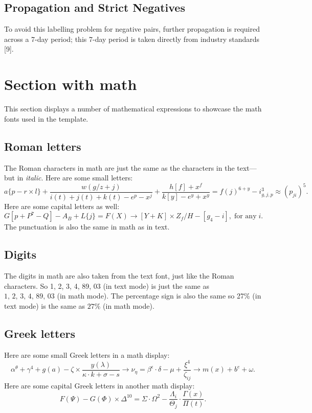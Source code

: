 \documentclass[letterpaper,11pt,leqno]{article}
\begin{document}
\subsection{Propagation and Strict Negatives}

To avoid this labelling problem for negative pairs, further propagation is required across a 7-day period; this 7-day period is taken directly from industry standards [9].

\section{Section with math}\label{s:math}

This section displays a number of mathematical expressions to showcase the math fonts used in the template.

\subsection{Roman letters} 

The Roman characters in math are just the same as the characters in the text---but in \textit{italic}. Here are some small letters: 
\begin{equation*}
a\{p - r \times l\} + \frac{w(g/z+j)}{i(t)+j(t)+k(t) - e^p - x^j} + \frac{h[f]+x^f}{k[y]-e^y + x^y} = f(j)^{6+y} - i^3_{g,j,p} \approx (p_{ji})^5.
\end{equation*}
Here are some capital letters as well: 
\begin{equation*}
G[p + P^7-Q] - A_B + L\{j\} = F(X) \to [Y+K]\times Z_f/H - [g_4 - i],\;\text{for any}\;i.
\end{equation*}
The punctuation is also the same in math as in text. 

\subsection{Digits}

The digits in math are also taken from the text font, just like the Roman characters. So 1, 2, 3, 4, 89, 03 (in text mode) is just the same as $1,\,2,\,3,\,4,\,89,\,03$ (in math mode). The percentage sign is also the same so 27\% (in text mode) is the same as $27\%$ (in math mode).

\subsection{Greek letters}

Here are some small Greek letters in a math display: 
\begin{equation*}
\alpha^{\theta} + \gamma^4 + g(a) - \zeta \times \frac{y(\lambda)}{\kappa \cdot k+ \sigma - s} \to \nu_{\eta} = \beta^\epsilon \cdot \delta - \mu + \frac{\xi^4}{\zeta_{ij}} \to m(x) + b^e + \omega .
\end{equation*}
Here are some capital Greek letters in another math display: 
\begin{equation}
F(\Psi) - G(\Phi) \times \Delta^{10} = \Sigma \cdot \Omega^2 - \frac{\Lambda_i}{\Theta_j} \cdot \frac{\Gamma(x)}{\Pi(t)}.
\label{e:capitalgreek}\end{equation}
\end{document}
